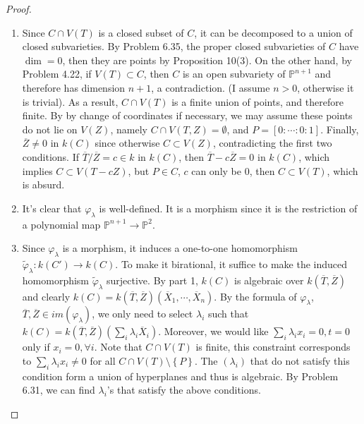 \documentclass{solution}
\begin{document}
\begin{proof}
    \begin{enumerate}
        \item Since $C \cap V(T)$ is a closed subset of $C$, it can be decomposed to a union of closed subvarieties. By Problem 6.35, the proper closed subvarieties of $C$ have $\dim = 0$, then they are points by Proposition 10(3). On the other hand, by Problem 4.22, if $V(T) \subset C$, then $C$ is an open subvariety of $\mathbb{P}^{n + 1}$ and therefore has dimension $n + 1$, a contradiction. (I assume $n \gt 0$, otherwise it is trivial). As a result, $C \cap V(T)$ is a finite union of points, and therefore finite. By by change of coordinates if necessary, we may assume these points do not lie on $V(Z)$, namely $C \cap V(T, Z) = \emptyset$, and $P = [0:\cdots:0:1]$. Finally, $\overline{Z} \ne 0$ in $k(C)$ since otherwise $C \subset V(Z)$, contradicting the first two conditions. If $\overline{T} / \overline{Z} = c \in k$ in $k(C)$, then $\overline{T} - c \overline{Z} = 0$ in $k(C)$, which implies $C \subset V(T - cZ)$, but $P \in C$, $c$ can only be $0$, then $C \subset V(T)$, which is absurd.
        \item It's clear that $\varphi_\lambda$ is well-defined. It is a morphism since it is the restriction of a polynomial map $\mathbb{P}^{n + 1} \rightarrow \mathbb{P}^2$.
        \item Since $\varphi_\lambda$ is a morphism, it induces a one-to-one homomorphism $\tilde{\varphi}_\lambda: k(C') \rightarrow k(C)$. To make it birational, it suffice to make the induced homomorphism $\tilde{\varphi}_\lambda$ surjective. By part 1, $k(C)$ is algebraic over $k(\overline{T}, \overline{Z})$ and clearly $k(C) = k(\overline{T}, \overline{Z})(\overline{X}_1, \cdots, \overline{X}_n)$. By the formula of $\varphi_\lambda$, $\overline{T}, \overline{Z} \in im(\varphi_\lambda)$, we only need to select $\lambda_i$ such that $k(C) = k(\overline{T}, \overline{Z})(\sum\limits_{i} \lambda_i \overline{X}_i)$. Moreover, we would like $\sum\limits_{i} \lambda_i x_i = 0, t = 0$ only if $x_i = 0, \forall i$. Note that $C \cap V(T)$ is finite, this constraint corresponds to $\sum\limits_{i} \lambda_i x_i \ne 0$ for all $C \cap V(T)\setminus \left\lbrace P \right\rbrace$. The $(\lambda_i)$ that do not satisfy this condition form a union of hyperplanes and thus is algebraic. By Problem 6.31, we can find $\lambda_i$'s that satisfy the above conditions.
    \end{enumerate}
\end{proof}
\end{document}
